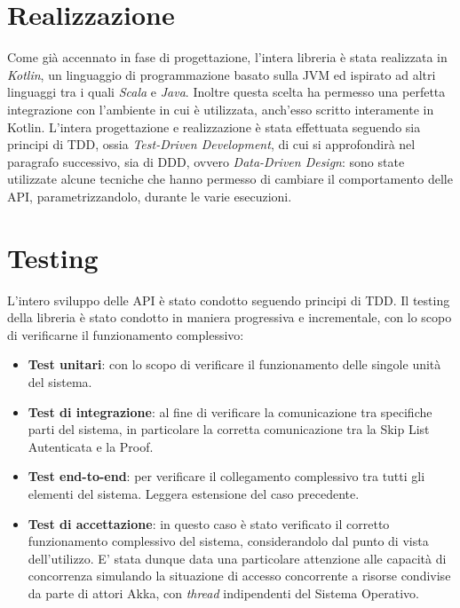 \section{Realizzazione}

	
	Come già accennato in fase di progettazione, l'intera libreria è stata realizzata in \textit{Kotlin}, un linguaggio di programmazione basato sulla JVM ed ispirato ad altri linguaggi tra i quali \textit{Scala} e \textit{Java}. Inoltre questa scelta ha permesso una perfetta integrazione con l'ambiente in cui è utilizzata, anch'esso scritto interamente in Kotlin.
	L'intera progettazione e realizzazione è stata effettuata seguendo sia principi di TDD, ossia \textit{Test-Driven Development}, di cui si approfondirà nel paragrafo successivo, sia di DDD, ovvero \textit{Data-Driven Design}: sono state utilizzate alcune tecniche che hanno permesso di cambiare il comportamento delle API, parametrizzandolo, durante le varie esecuzioni.

\section{Testing}


	L'intero sviluppo delle API è stato condotto seguendo principi di TDD. Il testing della libreria è stato condotto in maniera progressiva e incrementale, con lo scopo di verificarne il funzionamento complessivo:
	
	\begin{itemize}
		\item \textbf{Test unitari}: con lo scopo di verificare il funzionamento delle singole unità del sistema.
		\item \textbf{Test di integrazione}: al fine di verificare la comunicazione tra specifiche parti del sistema, in particolare la corretta comunicazione tra la Skip List Autenticata e la Proof.
		\item \textbf{Test end-to-end}: per verificare il collegamento complessivo tra tutti gli elementi del sistema. Leggera estensione del caso precedente.
		\item \textbf{Test di accettazione}: in questo caso è stato verificato il corretto funzionamento complessivo del sistema, considerandolo dal punto di vista dell'utilizzo. E' stata dunque data una particolare attenzione alle capacità di concorrenza simulando la situazione di accesso concorrente a risorse condivise da parte di attori Akka, con \textit{thread} indipendenti del Sistema Operativo.
	\end{itemize}

